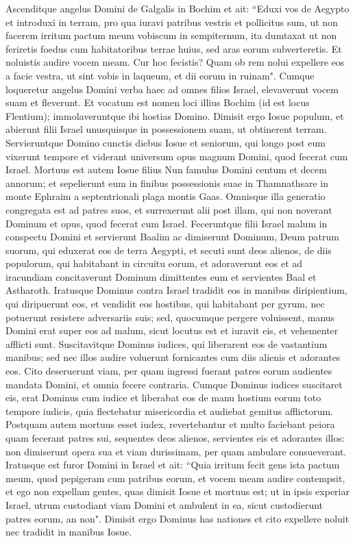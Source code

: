 \begin{biblechapter}  
\verse Ascenditque angelus Domini de Galgalis in Bochim et ait: “Eduxi vos de Aegypto et introduxi in terram, pro qua iuravi patribus vestris et pollicitus sum, ut non facerem irritum pactum meum vobiscum in sempiternum, 
\verse ita dumtaxat ut non feriretis foedus cum habitatoribus terrae huius, sed aras eorum subverteretis. Et noluistis audire vocem meam. Cur hoc fecistis? 
\verse Quam ob rem nolui expellere eos a facie vestra, ut sint vobis in laqueum, et dii eorum in ruinam". 
\verse Cumque loqueretur angelus Domini verba haec ad omnes filios Israel, elevaverunt vocem suam et fleverunt. 
\verse Et vocatum est nomen loci illius Bochim (id est locus Flentium); immolaveruntque ibi hostias Domino. 
\verse Dimisit ergo Iosue populum, et abierunt filii Israel unusquisque in possessionem suam, ut obtinerent terram. 
\verse Servieruntque Domino cunctis diebus Iosue et seniorum, qui longo post eum vixerunt tempore et viderant universum opus magnum Domini, quod fecerat cum Israel. 
\verse Mortuus est autem Iosue filius Nun famulus Domini centum et decem annorum; 
\verse et sepelierunt eum in finibus possessionis suae in Thamnathsare in monte Ephraim a septentrionali plaga montis Gaas. 
\verse Omnisque illa generatio congregata est ad patres suos, et surrexerunt alii post illam, qui non noverant Dominum et opus, quod fecerat cum Israel. 
\verse Feceruntque filii Israel malum in conspectu Domini et servierunt Baalim  
\verse ac dimiserunt Dominum, Deum patrum suorum, qui eduxerat eos de terra Aegypti, et secuti sunt deos alienos, de diis populorum, qui habitabant in circuitu eorum, et adoraverunt eos et ad iracundiam concitaverunt Dominum 
\verse dimittentes eum et servientes Baal et Astharoth. 
\verse Iratusque Dominus contra Israel tradidit eos in manibus diripientium, qui diripuerunt eos, et vendidit eos hostibus, qui habitabant per gyrum, nec potuerunt resistere adversariis suis; 
\verse sed, quocumque pergere voluissent, manus Domini erat super eos ad malum, sicut locutus est et iuravit eis, et vehementer afflicti sunt. 
\verse Suscitavitque Dominus iudices, qui liberarent eos de vastantium manibus;  
\verse sed nec illos audire voluerunt fornicantes cum diis alienis et adorantes eos. Cito deseruerunt viam, per quam ingressi fuerant patres eorum audientes mandata Domini, et omnia fecere contraria. 
\verse Cumque Dominus iudices suscitaret eis, erat Dominus cum iudice et liberabat eos de manu hostium eorum toto tempore iudicis, quia flectebatur misericordia et audiebat gemitus afflictorum. 
\verse Postquam autem mortuus esset iudex, revertebantur et multo faciebant peiora quam fecerant patres sui, sequentes deos alienos, servientes eis et adorantes illos: non dimiserunt opera sua et viam durissimam, per quam ambulare consueverant. 
\verse Iratusque est furor Domini in Israel et ait: “Quia irritum fecit gens ista pactum meum, quod pepigeram cum patribus eorum, et vocem meam audire contempsit, 
\verse et ego non expellam gentes, quas dimisit Iosue et mortuus est; 
\verse ut in ipsis experiar Israel, utrum custodiant viam Domini et ambulent in ea, sicut custodierunt patres eorum, an non". 
\verse Dimisit ergo Dominus has nationes et cito expellere noluit nec tradidit in manibus Iosue. 
\end{biblechapter}
